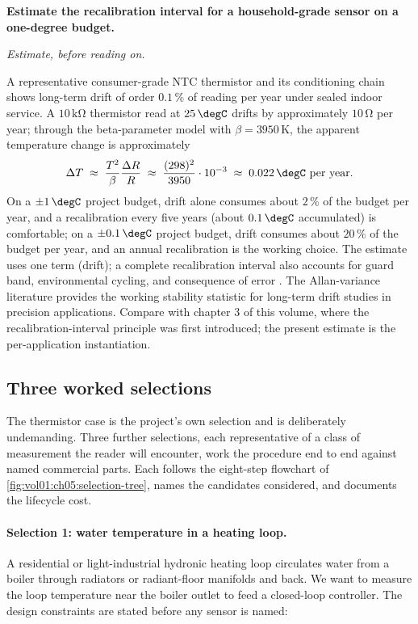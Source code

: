 \begin{estimation}
\textbf{Estimate the recalibration interval for a household-grade
sensor on a one-degree budget.}

\smallskip
\textit{Estimate, before reading on.}

\smallskip
A representative consumer-grade NTC thermistor and its conditioning
chain shows long-term drift of order $0.1 \,\%$ of reading per year
under sealed indoor service. A $10 \,\si{\kilo\ohm}$ thermistor read
at $25 \,\degC$ drifts by approximately $10 \,\si{\ohm}$ per year;
through the beta-parameter model with
$\beta = 3950 \,\si{\kelvin}$, the apparent temperature change is
approximately
\[
\Delta T \;\approx\; \frac{T^{2}}{\beta} \frac{\Delta R}{R}
\;\approx\; \frac{(298)^{2}}{3950} \cdot 10^{-3}
\;\approx\; 0.022 \,\degC \text{ per year}.
\]
On a $\pm 1 \,\degC$ project budget, drift alone consumes about
$2\,\%$ of the budget per year, and a recalibration every five
years (about $0.1 \,\degC$ accumulated) is comfortable; on a
$\pm 0.1 \,\degC$ project budget, drift consumes about $20\,\%$ of
the budget per year, and an annual recalibration is the working
choice. The estimate uses one term (drift); a complete recalibration
interval also accounts for guard band, environmental cycling, and
consequence of error \cite{std:ch05-jcgm-100}. The Allan-variance
literature \cite{paper:ch05-allan-1966} provides the working
stability statistic for long-term drift studies in precision
applications. Compare with chapter 3 of this volume, where the
recalibration-interval principle was first introduced; the present
estimate is the per-application instantiation.
\end{estimation}

\subsection{Three worked selections}

The thermistor case is the project's own selection and is
deliberately undemanding. Three further selections, each
representative of a class of measurement the reader will encounter,
work the procedure end to end against named commercial parts. Each
follows the eight-step flowchart of
\cref{fig:vol01:ch05:selection-tree}, names the candidates
considered, and documents the lifecycle cost.

\paragraph{Selection 1: water temperature in a heating loop.}
A residential or light-industrial hydronic heating loop circulates
water from a boiler through radiators or radiant-floor manifolds and
back. We want to measure the loop temperature near the boiler outlet
to feed a closed-loop controller. The design constraints are stated
before any sensor is named:

